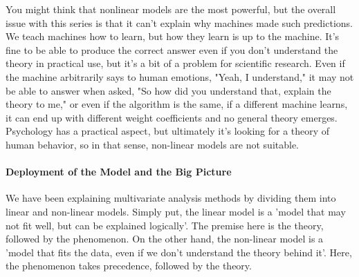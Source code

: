 \documentclass{ltjsbook}
\begin{document}
You might think that nonlinear models are the most powerful, but the overall issue with this series is that it can't explain why machines made such predictions. We teach machines how to learn, but how they learn is up to the machine. It's fine to be able to produce the correct answer even if you don't understand the theory in practical use, but it's a bit of a problem for scientific research. Even if the machine arbitrarily says to human emotions, "Yeah, I understand," it may not be able to answer when asked, "So how did you understand that, explain the theory to me," or even if the algorithm is the same, if a different machine learns, it can end up with different weight coefficients and no general theory emerges. Psychology has a practical aspect, but ultimately it's looking for a theory of human behavior, so in that sense, non-linear models are not suitable.

\paragraph{Deployment of the Model and the Big Picture}

We have been explaining multivariate analysis methods by dividing them into linear and non-linear models. Simply put, the linear model is a 'model that may not fit well, but can be explained logically'. The premise here is the theory, followed by the phenomenon. On the other hand, the non-linear model is a 'model that fits the data, even if we don't understand the theory behind it'. Here, the phenomenon takes precedence, followed by the theory.
\end{document}
